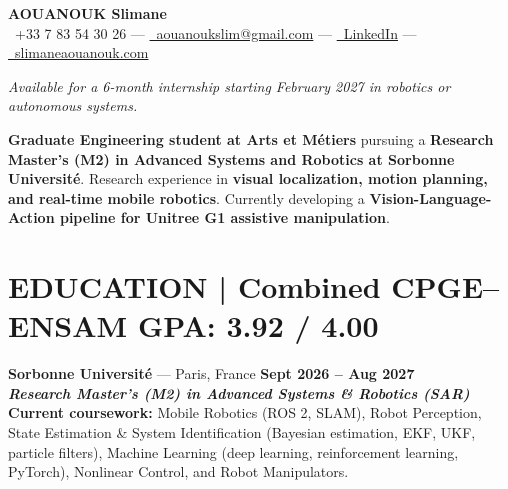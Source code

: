 \documentclass[10pt]{article}
\begin{document}
\pagestyle{empty}

\begin{center}
    {\LARGE \textbf{AOUANOUK Slimane}}\\
    \faPhone*~+33 7 83 54 30 26 \quad --- \quad
    {\hypersetup{urlcolor=black}\href{mailto:aouanoukslim@gmail.com}{\faEnvelope~aouanoukslim@gmail.com}} \quad --- \quad
    {\hypersetup{urlcolor=black}\href{https://www.linkedin.com/in/slimane-aouanouk/}{\faLinkedin~LinkedIn}} \quad --- \quad
    \href{https://slimaneaouanouk.com/}{\faGlobe~slimaneaouanouk.com}
\end{center}

\vspace{-1pt}
\begin{center}
    \textit{Available for a 6-month internship starting February 2027 in robotics or autonomous systems.}
    \end{center}
\medskip


\textbf{Graduate Engineering student at Arts et Métiers} pursuing a \textbf{Research Master's (M2) in Advanced Systems and Robotics at Sorbonne Université}. Research experience in \textbf{visual localization, motion planning, and real-time mobile robotics}. Currently developing a \textbf{Vision-Language-Action pipeline for Unitree G1 assistive manipulation}.

\medskip

\vspace{0em}

\section*{EDUCATION \; | \; \textbf{ Combined CPGE--ENSAM GPA: 3.92 / 4.00}}

\textbf{Sorbonne Université} --- Paris, France \hfill \textbf{Sept 2026 -- Aug 2027}\\
\textit{\textbf{Research Master's (M2) in Advanced Systems \& Robotics (SAR)}}\\
\textbf{Current coursework:} Mobile Robotics (ROS 2, SLAM), Robot Perception, State Estimation \& System Identification (Bayesian estimation, EKF, UKF, particle filters), Machine Learning (deep learning, reinforcement learning, PyTorch), Nonlinear Control, and Robot Manipulators.

\smallskip
\end{document}
